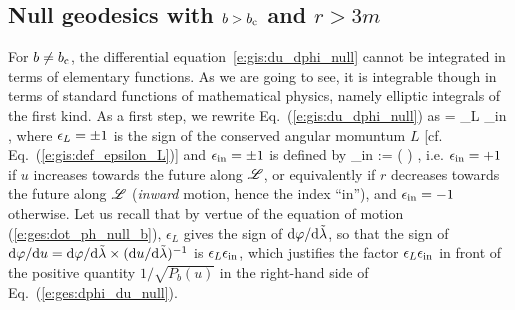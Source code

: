 \subsection{Null geodesics with $b > b_{\rm c}$ and $r> 3m$} \label{s:gis:geod_b_gt_bc_out}

For $b \not= b_{\rm c}$, the differential equation~\eqref{e:gis:du_dphi_null} cannot be integrated
in terms of elementary functions. As we are going to see, it is integrable
though in terms of standard
functions of mathematical physics, namely elliptic integrals of the first kind.
As a first step, we rewrite Eq.~(\ref{e:gis:du_dphi_null}) as
\be \label{e:ges:dphi_du_null}
    = \eps_L \eps_{\rm in}   ,
\ee
where $\epsilon_L = \pm 1$ is the sign of the conserved angular momuntum $L$
[cf. Eq.~(\ref{e:gis:def_epsilon_L})] and $\epsilon_{\rm in} = \pm 1$ is
defined by
\be
    \eps_{\rm in} :=  \left(  \right) ,
\ee
i.e. $\epsilon_{\rm in} = +1$ if $u$ increases towards the future along $\mathscr{L}$, or equivalently
if $r$ decreases towards the future along $\mathscr{L}$ (\emph{inward} motion, hence the index ``in''),
and $\epsilon_{\rm in} = -1$ otherwise.
Let us recall that by vertue of the equation of motion (\ref{e:ges:dot_ph_null_b}),
$\epsilon_L$ gives the sign of $\mathrm{d}\varphi/\mathrm{d}{\tilde\lambda}$, so that the sign of
$\mathrm{d}\varphi/\mathrm{d} u = \mathrm{d}\varphi/\mathrm{d}{\tilde\lambda} \times (\mathrm{d} u/\mathrm{d}{\tilde\lambda})^{-1}$ is $\epsilon_L \epsilon_{\rm in}$,
which justifies the factor $\epsilon_L \epsilon_{\rm in}$ in front of the positive
quantity $1/\sqrt{P_b(u)}$ in the right-hand side of Eq.~(\ref{e:ges:dphi_du_null}).

